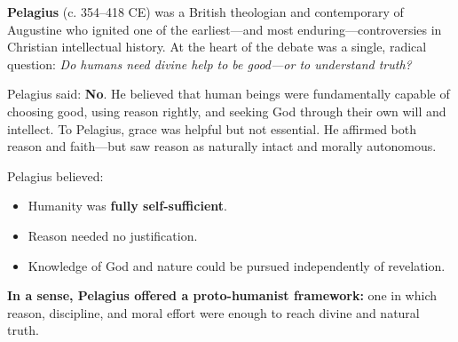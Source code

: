   \begin{tcolorbox}[
    colback=red!5!white,
    colframe=red!75!black,
    title=Historical Sidenote: Pelagius vs. Augustine — A Debate About Human Nature and Knowledge,
    fonttitle=\bfseries,
    sharp corners,
    boxrule=0.7pt,
    breakable
  ]
  
  \textbf{Pelagius} (c. 354–418 CE) was a British theologian and contemporary of Augustine who ignited one of the earliest—and most enduring—controversies in Christian intellectual history. At the heart of the debate was a single, radical question:
  \textit{Do humans need divine help to be good—or to understand truth?}
  
  \medskip
  
  \noindent Pelagius said: \textbf{No}. He believed that human beings were fundamentally capable of choosing good, using reason rightly, and seeking God through their own will and intellect. To Pelagius, grace was helpful but not essential. He affirmed both reason and faith—but saw reason as naturally intact and morally autonomous.
  
  \noindent Pelagius believed:
  \begin{itemize}
    \item Humanity was \textbf{fully self-sufficient}.
    \item Reason needed no justification.
    \item Knowledge of God and nature could be pursued independently of revelation.
  \end{itemize}
  
  \textbf{In a sense, Pelagius offered a proto-humanist framework:} one in which reason, discipline, and moral effort were enough to reach divine and natural truth.
  
  \end{tcolorbox}

